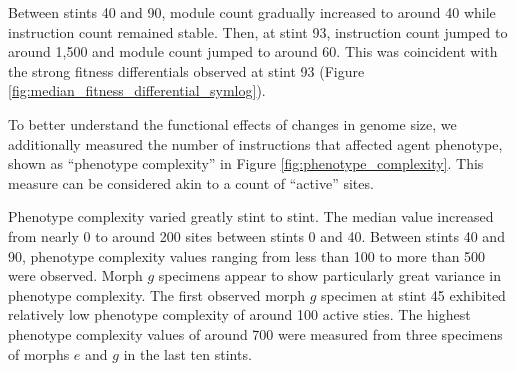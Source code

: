 Between stints 40 and 90, module count gradually increased to around 40 while instruction count remained stable.
Then, at stint 93, instruction count jumped to around 1,500 and module count jumped to around 60.
This was coincident with the strong fitness differentials observed at stint 93 (Figure \ref{fig:median_fitness_differential_symlog}).

To better understand the functional effects of changes in genome size, we additionally measured the number of instructions that affected agent phenotype, shown as ``phenotype complexity'' in Figure \ref{fig:phenotype_complexity}.
This measure can be considered akin to a count of ``active'' sites.

Phenotype complexity varied greatly stint to stint.
The median value increased from nearly 0 to around 200 sites between stints 0 and 40.
Between stints 40 and 90, phenotype complexity values ranging from less than 100 to more than 500 were observed.
Morph $g$ specimens appear to show particularly great variance in phenotype complexity.
The first observed morph $g$ specimen at stint 45 exhibited relatively low phenotype complexity of around 100 active sties.
The highest phenotype complexity values of around 700 were measured from three specimens of morphs $e$ and $g$ in the last ten stints.
